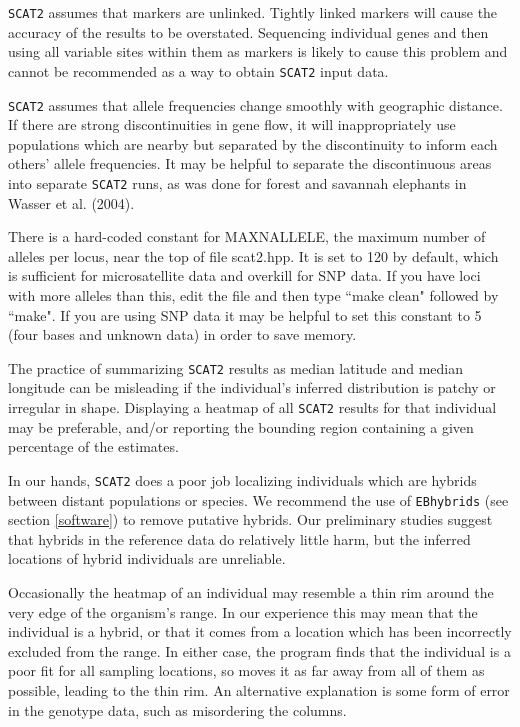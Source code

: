 \documentclass[10pt,titlepage,times,letterpaper]{article}
\def\SCAT{{\tt SCAT2} }
\begin{document}
\SCAT assumes that markers are unlinked.  Tightly linked markers will
cause the accuracy of the results to be overstated.  Sequencing individual
genes and then using all variable sites within them as markers is likely
to cause this problem and cannot be recommended as a way to obtain \SCAT
input data.

\SCAT assumes that allele frequencies change smoothly with geographic
distance.  If there are strong discontinuities in gene flow, it will
inappropriately use populations which are nearby but separated by the
discontinuity to inform each others' allele frequencies.  It may be
helpful to separate the discontinuous areas into separate \SCAT runs,
as was done for forest and savannah elephants in Wasser et al. (2004).

There is a hard-coded constant for MAXNALLELE, the maximum number
of alleles per locus, near the top of file scat2.hpp.  It is set to 120
by default, which is sufficient for microsatellite data and overkill for
SNP data.  If you have loci with more alleles than this, edit the
file and then type ``make clean" followed by ``make".  If you are using
SNP data it may be helpful to set this constant to 5 (four bases and unknown
data) in order to save memory.

The practice of summarizing \SCAT results as median latitude and
median longitude can be misleading if the individual's
inferred distribution is patchy or irregular in shape.  Displaying
a heatmap of all \SCAT results for that individual may be preferable,
and/or reporting the bounding region containing a given percentage
of the estimates.

In our hands, \SCAT does a poor job localizing individuals which are
hybrids between distant populations or species.  We recommend the use
of {\tt EBhybrids} (see section \ref{software}) to remove putative hybrids.
Our preliminary studies suggest that hybrids in the reference data do
relatively little harm, but the inferred locations of hybrid individuals are
unreliable. 

Occasionally the heatmap of an individual may resemble a thin rim around the
very edge of the organism's range.  In our experience this may mean that
the individual is a hybrid, or that it comes from a location which has been
incorrectly excluded from the range.  In either case, the program finds that
the individual is a poor fit for all sampling locations, so moves it as far
away from all of them as possible, leading to the thin rim.  An alternative
explanation is some form of error in the genotype data, such as misordering
the columns.
\end{document}
